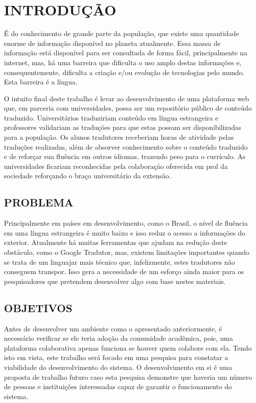 
\chapter{INTRODUÇÃO}
\label{chap:introducao}

É do conhecimento de grande parte da população, que existe uma quantidade enorme de informação disponível no planeta atualmente. Essa massa de informação está disponível para ser consultada de forma fácil, principalmente na internet, mas, há uma barreira que dificulta o uso amplo destas informações e, consequentemente, dificulta a criação e/ou evolução de tecnologias pelo mundo. Esta barreira é a língua.

O intuito final deste trabalho é levar ao desenvolvimento de uma plataforma web que, em parceria com universidades, possa ser um repositório público de conteúdo traduzido. Universitários traduziriam conteúdo em língua estrangeira e professores validariam as traduções para que estas possam ser disponibilizadas para a população. Os alunos tradutores receberiam horas de atividade pelas traduções realizadas, além de absorver conhecimento sobre o conteúdo traduzido e de reforçar sua fluência em outros idiomas, trazendo peso para o currículo. As universidades ficariam reconhecidas pela colaboração oferecida em prol da sociedade reforçando o braço universitário da extensão.

\section{PROBLEMA}
\label{sec:introProblema}
Principalmente em países em desenvolvimento, como o Brasil, o nível de fluência em uma língua estrangeira é muito baixo e isso reduz o acesso a informações do exterior. Atualmente há muitas ferramentas que ajudam na redução deste obstáculo, como o Google Tradutor, mas, existem limitações importantes quando se trata de um linguajar mais técnico que, infelizmente, estes tradutores não conseguem transpor. Isso gera a necessidade de um esforço ainda maior para os pesquisadores que pretendem desenvolver algo com base nestes materiais.

\section{OBJETIVOS}
\label{sec:introObjetivos}
Antes de desenvolver um ambiente como o apresentado anteriormente, é necessário verificar se ele teria adoção da comunidade acadêmica, pois, uma plataforma colaborativa apenas funciona se houver quem colabore com ela. Tendo isto em vista, este trabalho será focado em uma pesquisa para constatar a viabilidade do desenvolvimento do sistema. O desenvolvimento em si é uma proposta de trabalho futuro caso esta pesquisa demonstre que haveria um número de pessoas e instituições interessadas capaz de garantir o funcionamento do sistema.

